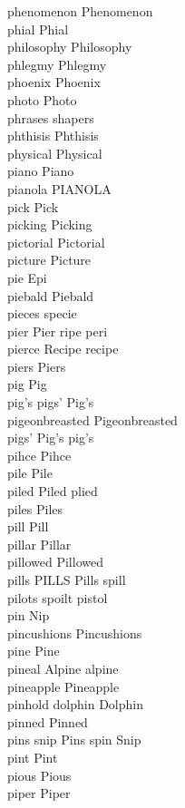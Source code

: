 phenomenon Phenomenon\\
phial Phial\\
philosophy Philosophy\\
phlegmy Phlegmy\\
phoenix Phoenix\\
photo Photo\\
phrases shapers\\
phthisis Phthisis\\
physical Physical\\
piano Piano\\
pianola PIANOLA\\
pick Pick\\
picking Picking\\
pictorial Pictorial\\
picture Picture\\
pie Epi\\
piebald Piebald\\
pieces specie\\
pier Pier ripe peri\\
pierce Recipe recipe\\
piers Piers\\
pig Pig\\
pig's pigs' Pig's\\
pigeonbreasted Pigeonbreasted\\
pigs' Pig's pig's\\
pihce Pihce\\
pile Pile\\
piled Piled plied\\
piles Piles\\
pill Pill\\
pillar Pillar\\
pillowed Pillowed\\
pills PILLS Pills spill\\
pilots spoilt pistol\\
pin Nip\\
pincushions Pincushions\\
pine Pine\\
pineal Alpine alpine\\
pineapple Pineapple\\
pinhold dolphin Dolphin\\
pinned Pinned\\
pins snip Pins spin Snip\\
pint Pint\\
pious Pious\\
piper Piper\\
